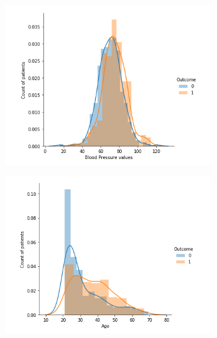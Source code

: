 \documentclass[12pt]{article}
\begin{document}
\begin{figure}
\centering
\begin{subfigure}{0.6\textwidth}
  \centering
  \includegraphics[width=1\linewidth]{BP.PNG}
  \label{fig:sub1}
\end{subfigure}%
\begin{subfigure}{.6\textwidth}
  \centering
  \includegraphics[width=1\linewidth]{age.PNG}
  \label{fig:sub2}
\end{subfigure}
\label{fig:test}
\end{figure}
\end{document}
